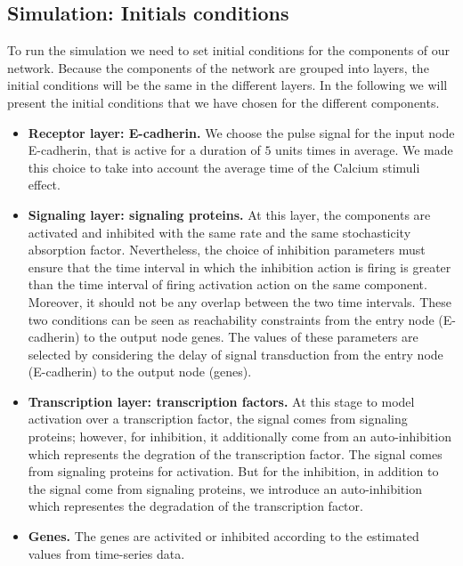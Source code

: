   


\subsection{Simulation: Initials conditions}
To run the simulation we need to set initial conditions for the components of our network. Because the components of the network are grouped into 
layers, the initial conditions will be the same in the different layers. In the following we will present the initial conditions that we have chosen for the different 
components.

\begin{itemize}
 \item \textbf{Receptor layer: E-cadherin.} We choose the  pulse signal for the input node E-cadherin, that is active for a duration of $5$ units times in average. We made this 
 choice to take into account the average time of the Calcium stimuli effect.
 \item \textbf{Signaling layer: signaling proteins.} At this layer, the components are activated and inhibited with the same rate and the same stochasticity absorption factor. 
 Nevertheless, the choice of inhibition parameters must ensure that the time interval in which the inhibition action 
 is firing is greater than the time interval of firing activation action on the same component. Moreover, it should not be any overlap between the two time intervals. These two conditions
 can be seen as reachability constraints from the entry  node (E-cadherin) to the output node genes. The values of these parameters are selected by considering the delay of signal transduction from the entry
 node (E-cadherin) to the output node (genes).
 \item \textbf{Transcription layer: transcription factors.} At this stage to model activation over a transcription factor, the signal comes from signaling proteins; however, for inhibition, it additionally 
 come from an auto-inhibition which represents the degration of the transcription factor. The signal comes from signaling proteins for activation. But for the inhibition, in addition 
 to the signal come from signaling proteins, we introduce an auto-inhibition which representes the degradation of the transcription factor.
 \item \textbf{Genes.} The genes are activited or inhibited according to the estimated values from time-series data.
\end{itemize}

